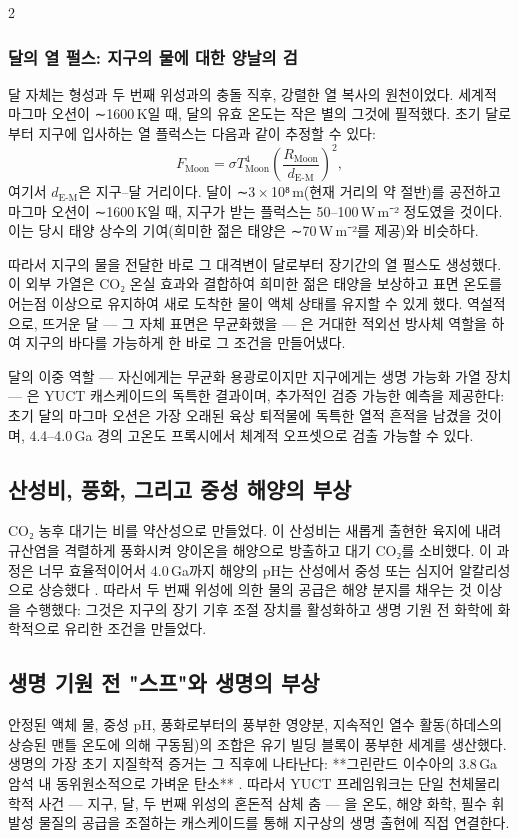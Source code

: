 \documentclass[12pt,a4paper]{article}
\begin{document}
\begin{multicols}{2}
		\subsubsection{달의 열 펄스: 지구의 물에 대한 양날의 검}
		달 자체는 형성과 두 번째 위성과의 충돌 직후, 강렬한 열 복사의 원천이었다. 세계적 마그마 오션이 ∼1600 K일 때, 달의 유효 온도는 작은 별의 그것에 필적했다. 초기 달로부터 지구에 입사하는 열 플럭스는 다음과 같이 추정할 수 있다:
		\[
		F_{\text{Moon}} = \sigma T_{\text{Moon}}^{4} \left( \frac{R_{\text{Moon}}}{d_{\text{E-M}}} \right)^{2},
		\]
		여기서 \(d_{\text{E-M}}\)은 지구–달 거리이다. 달이 ∼3 × 10⁸ m(현재 거리의 약 절반)를 공전하고 마그마 오션이 ∼1600 K일 때, 지구가 받는 플럭스는 50–100 W m⁻² 정도였을 것이다. 이는 당시 태양 상수의 기여(희미한 젊은 태양은 ∼70 W m⁻²를 제공)와 비슷하다.
		
		따라서 지구의 물을 전달한 바로 그 대격변이 달로부터 장기간의 열 펄스도 생성했다. 이 외부 가열은 CO₂ 온실 효과와 결합하여 희미한 젊은 태양을 보상하고 표면 온도를 어는점 이상으로 유지하여 새로 도착한 물이 액체 상태를 유지할 수 있게 했다. 역설적으로, 뜨거운 달 — 그 자체 표면은 무균화했을 — 은 거대한 적외선 방사체 역할을 하여 지구의 바다를 가능하게 한 바로 그 조건을 만들어냈다.
		
		달의 이중 역할 — 자신에게는 무균화 용광로이지만 지구에게는 생명 가능화 가열 장치 — 은 YUCT 캐스케이드의 독특한 결과이며, 추가적인 검증 가능한 예측을 제공한다: 초기 달의 마그마 오션은 가장 오래된 육상 퇴적물에 독특한 열적 흔적을 남겼을 것이며, 4.4–4.0 Ga 경의 고온도 프록시에서 체계적 오프셋으로 검출 가능할 수 있다.
		
		\subsection{산성비, 풍화, 그리고 중성 해양의 부상}
		CO₂ 농후 대기는 비를 약산성으로 만들었다. 이 산성비는 새롭게 출현한 육지에 내려 규산염을 격렬하게 풍화시켜 양이온을 해양으로 방출하고 대기 CO₂를 소비했다. 이 과정은 너무 효율적이어서 4.0 Ga까지 해양의 pH는 산성에서 중성 또는 심지어 알칼리성으로 상승했다 \cite{KrissansenTotton2019}. 따라서 두 번째 위성에 의한 물의 공급은 해양 분지를 채우는 것 이상을 수행했다: 그것은 지구의 장기 기후 조절 장치를 활성화하고 생명 기원 전 화학에 화학적으로 유리한 조건을 만들었다.
		
		\subsection{생명 기원 전 "스프"와 생명의 부상}
		안정된 액체 물, 중성 pH, 풍화로부터의 풍부한 영양분, 지속적인 열수 활동(하데스의 상승된 맨틀 온도에 의해 구동됨)의 조합은 유기 빌딩 블록이 풍부한 세계를 생산했다. 생명의 가장 초기 지질학적 증거는 그 직후에 나타난다: **그린란드 이수아의 3.8 Ga 암석 내 동위원소적으로 가벼운 탄소** \cite{Arndt2012}. 따라서 YUCT 프레임워크는 단일 천체물리학적 사건 — 지구, 달, 두 번째 위성의 혼돈적 삼체 춤 — 을 온도, 해양 화학, 필수 휘발성 물질의 공급을 조절하는 캐스케이드를 통해 지구상의 생명 출현에 직접 연결한다.
		

\end{multicols}
\end{document}
